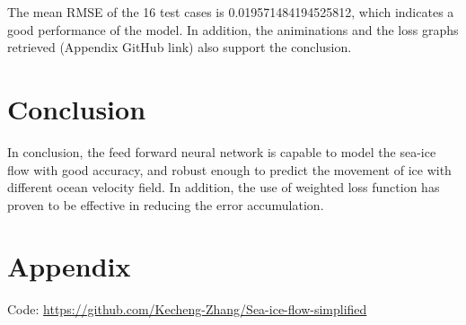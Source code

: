 \documentclass[12pt, a4paper]{article}
\begin{document}
The mean RMSE of the 16 test cases is 0.019571484194525812, which indicates a good performance of the model. In addition, the animinations and the loss graphs retrieved (Appendix GitHub link) also support the conclusion.

\section{Conclusion}
In conclusion, the feed forward neural network is capable to model the sea-ice flow with good accuracy, and robust enough to predict the movement of ice with different ocean velocity field. In addition, the use of weighted loss function has proven to be effective in reducing the error accumulation.

\newpage
\section{Appendix}
Code: 
\href{https://github.com/Kecheng-Zhang/Sea-ice-flow-simplified}{https://github.com/Kecheng-Zhang/Sea-ice-flow-simplified}
\end{document}
